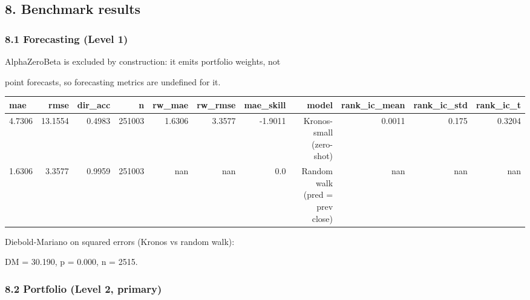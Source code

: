 \subsection*{8. Benchmark results}

\subsubsection*{8.1 Forecasting (Level 1)}

AlphaZeroBeta is excluded by construction: it emits portfolio weights, not\par
point forecasts, so forecasting metrics are undefined for it.\par

\begin{center}\footnotesize\begin{longtable}{lrrrrrrrrrr}
\toprule
mae & rmse & dir\_acc & n & rw\_mae & rw\_rmse & mae\_skill & model & rank\_ic\_mean & rank\_ic\_std & rank\_ic\_t \\
\midrule
4.7306 & 13.1554 & 0.4983 & 251003 & 1.6306 & 3.3577 & -1.9011 & Kronos-small (zero-shot) & 0.0011 & 0.175 & 0.3204 \\
1.6306 & 3.3577 & 0.9959 & 251003 & nan & nan & 0.0 & Random walk (pred = prev close) & nan & nan & nan \\
\bottomrule
\end{longtable}\end{center}

Diebold-Mariano on squared errors (Kronos vs random walk):\par
DM = 30.190, p = 0.000, n = 2515.\par

\subsubsection*{8.2 Portfolio (Level 2, primary)}

